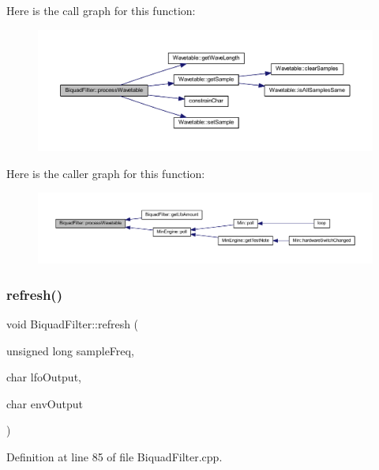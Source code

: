 Here is the call graph for this function\+:
\nopagebreak
\begin{figure}[H]
\begin{center}
\leavevmode
\includegraphics[width=350pt]{d9/d6f/class_biquad_filter_a205ea1f856a52f5d369d45cf385df801_cgraph}
\end{center}
\end{figure}
Here is the caller graph for this function\+:
\nopagebreak
\begin{figure}[H]
\begin{center}
\leavevmode
\includegraphics[width=350pt]{d9/d6f/class_biquad_filter_a205ea1f856a52f5d369d45cf385df801_icgraph}
\end{center}
\end{figure}
\mbox{\label{class_biquad_filter_a6b84cee1d3982596d90d3b1a74208b2a}} 
\subsubsection{\texorpdfstring{refresh()}{refresh()}}
{\footnotesize\ttfamily void Biquad\+Filter\+::refresh (\begin{DoxyParamCaption}\item[{unsigned long}]{sample\+Freq,  }\item[{char}]{lfo\+Output,  }\item[{char}]{env\+Output }\end{DoxyParamCaption})}



Definition at line 85 of file Biquad\+Filter.\+cpp.

